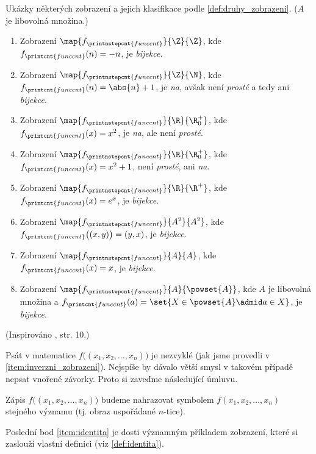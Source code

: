 \begin{example}
    Ukázky některých zobrazení a jejich klasifikace podle \ref{def:druhy_zobrazeni}. ($A$ je libovolná množina.)
    \begin{enumerate}[label=(\roman*)]
        \item Zobrazení $\map{f_{\printnstepcnt{funccnt}}}{\Z}{\Z}$, kde $f_{\printcnt{funccnt}}(n)=-n$, je \emph{bijekce}.
        \item Zobrazení $\map{f_{\printnstepcnt{funccnt}}}{\Z}{\N}$, kde $f_{\printcnt{funccnt}}(n)=\abs{n}+1$, je \emph{na}, avšak není \emph{prosté} a tedy ani \emph{bijekce}.
        \item Zobrazení $\map{f_{\printnstepcnt{funccnt}}}{\R}{\R_0^+}$, kde $f_{\printcnt{funccnt}}(x)=x^2$, je \emph{na}, ale není \emph{prosté}.
        \item Zobrazení $\map{f_{\printnstepcnt{funccnt}}}{\R}{\R_0^+}$, kde $f_{\printcnt{funccnt}}(x)=x^2+1$, není \emph{prosté}, ani \emph{na}.
        \item Zobrazení $\map{f_{\printnstepcnt{funccnt}}}{\R}{\R^+}$, kde $f_{\printcnt{funccnt}}(x)=e^x$, je \emph{bijekce}.
        \item\label{item:inverzni_zobrazeni} Zobrazení $\map{f_{\printnstepcnt{funccnt}}}{A^2}{A^2}$, kde $f_{\printcnt{funccnt}}\bigl((x,y)\bigr)=(y,x)$, je \emph{bijekce}.
        \item\label{item:identita} Zobrazení $\map{f_{\printnstepcnt{funccnt}}}{A}{A}$, kde $f_{\printcnt{funccnt}}(x)=x$, je \emph{bijekce}.
        \item \sloppy Zobrazení $\map{f_{\printnstepcnt{funccnt}}}{A}{\powset{A}}$, kde $A$ je libovolná množina a $f_{\printcnt{funccnt}}(a)=\set{X\in\powset{A}\admid a\in X}$, je \emph{bijekce}.
    \end{enumerate}
\end{example}
(Inspirováno \cite{Becvar2019}, str. 10.)\par
Psát v matematice $f\bigl((x_1,x_2,\dots,x_n)\bigr)$ je nezvyklé (jak jsme provedli v \ref{item:inverzni_zobrazeni}). Nejspíše by dávalo větší smysl v takovém případě nepsat vnořené závorky. Proto si zaveďme následující úmluvu.
\begin{convention}
    Zápis $f\bigl((x_1,x_2,\dots,x_n)\bigr)$ budeme nahrazovat symbolem $f(x_1,x_2,\dots,x_n)$ stejného významu (tj. obraz uspořádané $n$-tice).
\end{convention}
Poslední bod \ref{item:identita} je dosti významným příkladem zobrazení, které si zaslouží vlastní definici (viz \ref{def:identita}).
